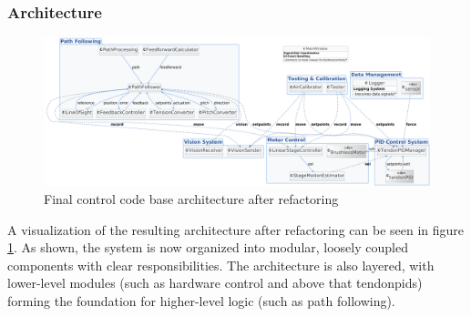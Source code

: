 \subsubsection{Architecture}
\begin{figure} [H]
	\centering
	\includegraphics[width=1.1\linewidth]{images/Software documentation/architecture3.png}
	\caption{Final control code base architecture after refactoring}
	\label{fig:architecture}
\end{figure}
\leavevmode\newline
A visualization of the resulting architecture after refactoring can be seen in figure \ref{fig:architecture}. As shown, the system is now organized into modular, loosely coupled components with clear responsibilities. The architecture is also layered, with lower-level modules (such as hardware control and above that tendonpids) forming the foundation for higher-level logic (such as path following).






